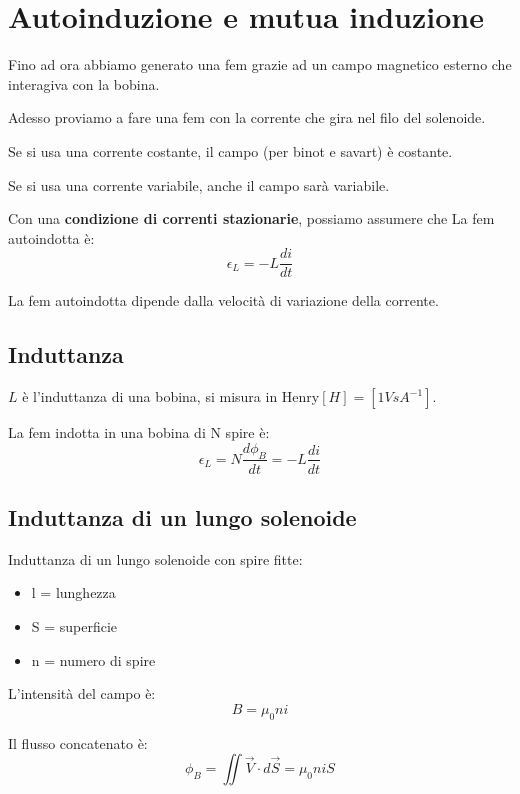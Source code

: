\section{Autoinduzione e mutua induzione}
Fino ad ora abbiamo generato una fem grazie ad un campo magnetico
esterno che interagiva con la bobina.


Adesso proviamo a fare una fem con la corrente
che gira nel filo del solenoide.

Se si usa una corrente costante, il campo (per binot e savart)
è costante.

Se si usa una corrente variabile, anche il campo sarà variabile.


Con una \textbf{condizione di correnti stazionarie}, possiamo assumere che
La fem autoindotta è:
\begin{equation*}
    \epsilon_L = -L\frac{di}{dt}
\end{equation*}

La fem autoindotta dipende dalla velocità di variazione della corrente.

\subsection{Induttanza}
$L$ è l'induttanza di una bobina, si misura in Henry$[H] = [1VsA^{-1}]$.


La fem indotta in una bobina di N spire è:
\begin{equation}
    \epsilon_L = N\frac{d\phi_B}{dt} = -L\frac{di}{dt}
\end{equation}

\subsection{Induttanza di un lungo solenoide}
Induttanza di un lungo solenoide con spire fitte:
\begin{itemize}
    \item l = lunghezza
    \item S = superficie
    \item n = numero di spire
\end{itemize}

L'intensità del campo è:
\begin{equation}
    B = \mu_0ni
\end{equation}

Il flusso concatenato è:
\begin{equation}
    \phi_B = \iint{\vec{V}\cdot d\vec{S}} = \mu_0niS
\end{equation}

